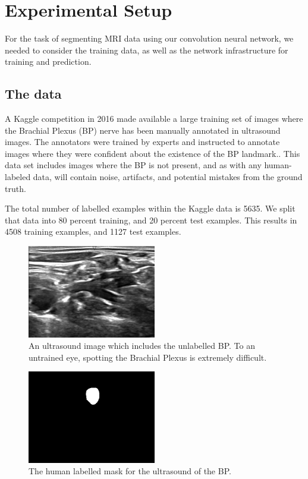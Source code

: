 \documentclass[letterpaper]{article}
\begin{document}
\section{Experimental Setup}
For the task of segmenting MRI data using our convolution neural network, we needed to consider the training data, as well as the network infrastructure for training and prediction.

\subsection{The data}
A Kaggle competition in 2016 \cite{kagglenerve} made available a large training set of images where the Brachial Plexus (BP) nerve has been manually annotated in ultrasound images. The annotators were trained by experts and instructed to annotate images where they were confident about the existence of the BP landmark.. This data set includes images where the BP is not present, and as with any human-labeled data, will contain noise, artifacts, and potential mistakes from the ground truth. 

The total number of labelled examples within the Kaggle data is 5635. We split that data into 80 percent training, and 20 percent test examples. This results in 4508 training examples, and 1127 test examples. 

 \begin{figure}[H]
  \centerline{\includegraphics[width=0.5\textwidth]{Images/1_4.png}}
  \caption{An ultrasound image which includes the unlabelled BP. To an untrained eye, spotting the Brachial Plexus is extremely difficult.}
  \label{fig:BPInUltrasound}
\end{figure}

 \begin{figure}[H]
  \centerline{\includegraphics[width=0.5\textwidth]{Images/1_4_mask.png}}
  \caption{The human labelled mask for the ultrasound of the BP.}
  \label{fig:BPMask}
\end{figure}
\end{document}
